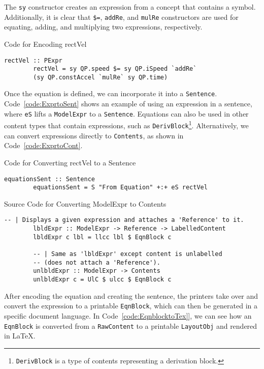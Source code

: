 The \texttt{sy} constructor creates an expression from a concept that contains 
a symbol. Additionally, it is clear that \texttt{\$=}, \texttt{addRe}, and 
\texttt{mulRe} constructors are used for equating, adding, and multiplying two 
expressions, respectively.

\begin{listing}[h]
	\caption{Code for Encoding rectVel}
	\label{code:encodeProjExpr}
	\begin{lstlisting}[language=haskell1]
		rectVel :: PExpr
		rectVel = sy QP.speed $= sy QP.iSpeed `addRe` 
		(sy QP.constAccel `mulRe` sy QP.time)
	\end{lstlisting}
\end{listing}

Once the equation is defined, we can incorporate it into a \texttt{Sentence}. 
Code~\ref{code:ExprtoSent} shows an example of using an expression in a 
sentence, where \texttt{eS} lifts a \texttt{ModelExpr} to a 
\texttt{Sentence}. Equations can also be used in other content types that 
contain expressions, such as \texttt{DerivBlock}\footnote{\texttt{DerivBlock} 
is a type of contents representing a derivation block.}. Alternatively, we can 
convert expressions directly to \texttt{Contents}, as shown in 
Code~\ref{code:ExprtoCont}.

\begin{listing}[h]
	\caption{Code for Converting rectVel to a Sentence}
	\label{code:ExprtoSent}
	\begin{lstlisting}[language=haskell1]
		equationsSent :: Sentence
		equationsSent = S "From Equation" +:+ eS rectVel
	\end{lstlisting}
\end{listing}

\begin{listing}[h]
	\caption{Source Code for Converting ModelExpr to Contents}
	\label{code:ExprtoCont}
	\begin{lstlisting}[language=haskell1]
		-- | Displays a given expression and attaches a 'Reference' to it.
		lbldExpr :: ModelExpr -> Reference -> LabelledContent
		lbldExpr c lbl = llcc lbl $ EqnBlock c
		
		-- | Same as 'lbldExpr' except content is unlabelled 
		-- (does not attach a 'Reference').
		unlbldExpr :: ModelExpr -> Contents
		unlbldExpr c = UlC $ ulcc $ EqnBlock c
	\end{lstlisting}
\end{listing}

After encoding the equation and creating the sentence, the printers take over 
and convert the expression to a printable \texttt{EqnBlock}, which can then be 
generated in a specific document language. In Code~\ref{code:EqnblocktoTex]}, 
we can see how an \texttt{EqnBlock} is converted from a \texttt{RawContent} to 
a printable \texttt{LayoutObj} and rendered in LaTeX.

